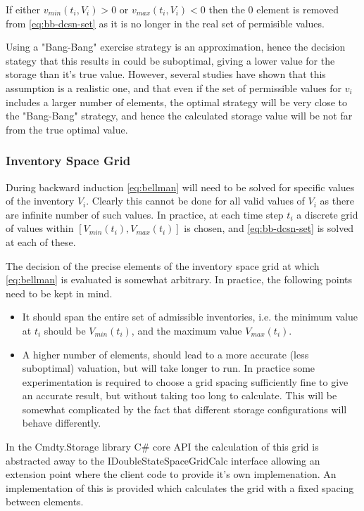 \documentclass{article}
\begin{document}
If either $v_{min}(t_i, V_i) > 0$ or $v_{max}(t_i, V_i) < 0$ then the 0 element is removed 
from \ref{eq:bb-dcsn-set} as it is no longer in the real set of permisible values.

\bigskip

Using a "Bang-Bang" exercise strategy is an approximation, hence the decision stategy that
this results in could be suboptimal, giving a lower value for the storage than it's true
value. However, several studies have shown that this assumption is a realistic one, and that
even if the set of permissible values for $v_i$ includes a larger number of elements, the
optimal strategy will be very close to the "Bang-Bang" strategy, and hence the calculated 
storage value will be not far from the true optimal value.

\subsubsection{Inventory Space Grid}
During backward induction \ref{eq:bellman} will need to be solved for specific 
values of the inventory $V_i$. Clearly this cannot be done for all valid values of 
$V_i$ as there are infinite number of such values.
In practice, at each time step $t_i$ a discrete grid of values within 
$[V_{min}(t_i), V_{max}(t_i)]$ is chosen, and \ref{eq:bb-dcsn-set} is solved at each
of these. 

\bigskip
The decision of the precise elements of the inventory space grid at which \ref{eq:bellman}
is evaluated is somewhat arbitrary. In practice, the following points need to be kept
in mind.
\begin{itemize}
    \item It should span the entire set of admissible inventories, i.e. the minimum
    value at $t_i$ should be $V_{min}(t_i)$, and the maximum value $V_{max}(t_i)$.
    \item A higher number of elements, should lead to a more accurate (less suboptimal)
    valuation, but will take longer to run. In practice some experimentation is required
    to choose a grid spacing sufficiently fine to give an accurate result, but without 
    taking too long to calculate. This will be somewhat complicated by the fact that 
    different storage configurations will behave differently.
\end{itemize}

\bigskip
In the Cmdty.Storage library C\# core API the calculation of this grid is abstracted 
away to the IDoubleStateSpaceGridCalc interface allowing an extension point where the 
client code to provide it's own implemenation. An implementation of this is provided
which calculates the grid with a fixed spacing between elements.
\end{document}

